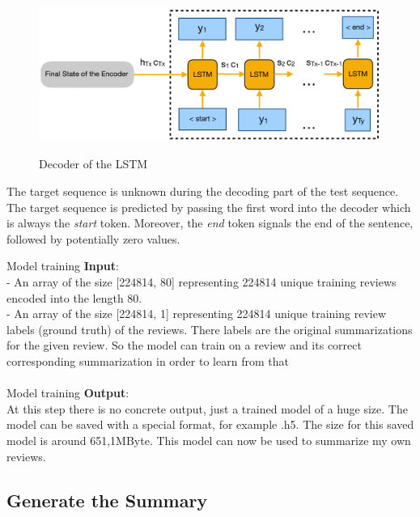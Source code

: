 \begin{figure}
	\begin{center}
		\includegraphics[width=6in]{photos/traindec-1}\\
		\caption{Decoder of the LSTM}\label{traindec}
	\end{center}
\end{figure}

The target sequence is unknown during the decoding part of the test sequence. The target sequence is predicted by passing the first word into the decoder which is always the \textit{start} token. Moreover, the \textit{end} token signals the end of the sentence, followed by potentially zero values.


\begin{tcolorbox}
	Model training \textbf{Input}:\\
	
	- An array of the size [224814, 80] representing 224814 unique training reviews encoded into the length 80. \\
	- An array of the size [224814, 1] representing 224814 unique training review labels (ground truth) of the reviews. There labels are the original summarizations for the given review. So the model can train on a review and its correct corresponding summarization in order to learn from that
	\\\\
	Model training \textbf{Output}:\\
	
	At this step there is no concrete output, just a trained model of a huge size. The model can be saved with a special format, for example .h5. The size for this saved model is around 651,1MByte. This model can now be used to summarize my own reviews.
\end{tcolorbox}

\subsection{Generate the Summary}\label{ss:generate}

